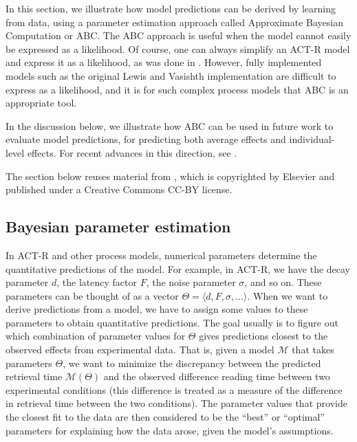 \documentclass{cambridge7A}\usepackage[]{graphicx}\usepackage[]{color}
\begin{document}
In this section, we illustrate how model predictions can be derived by learning from data, using a parameter estimation approach called  Approximate Bayesian Computation or ABC. The ABC approach is useful when the model cannot easily be  expressed as a likelihood.  Of course, one can always simplify an ACT-R model and express it as a likelihood, as was done in \cite{NicenboimRetrieval2018,LissonEtAl2020}. However, fully implemented models such as the original Lewis and Vasishth implementation are difficult to express as a likelihood, and it is for such complex process models that ABC is an appropriate tool. 

In the discussion below, we illustrate how ABC can be used in future work to evaluate model predictions, for predicting both average effects and individual-level effects. For recent advances in this direction, see \cite{YadavEtAlAMLaP2020}.

The section below reuses material from \cite{VasishthMethodsX2019}, which is copyrighted by Elsevier and published under a Creative Commons CC-BY license.

\subsection{Bayesian parameter estimation}

In ACT-R and other process models, numerical parameters determine the quantitative predictions of the model. For example, in ACT-R, we have the decay parameter $d$, the latency factor $F$, the noise parameter $\sigma$, and so on. These parameters can be thought of as a vector $\Theta=\langle d,F,\sigma,\dots\rangle$. When we want to derive predictions from a model, we have to assign some values to these parameters to obtain quantitative predictions. The goal usually is to figure out which combination of parameter values for $\Theta$ gives predictions closest to the observed effects from experimental data. That is, given a model $\mathcal{M}$ that takes parameters $\Theta$, we want to minimize the discrepancy between the predicted retrieval time $\mathcal{M}(\Theta)$ and the observed difference reading time between two experimental conditions (this difference is treated as a measure of the difference in retrieval time between the two conditions). The parameter values that provide the closest fit to the data are then considered to be the ``best'' or ``optimal'' parameters for explaining how the data arose, given the model's assumptions.
\end{document}
